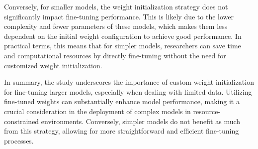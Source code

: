 Conversely, for smaller models, the weight initialization strategy does not significantly impact fine-tuning performance. This is likely due to the lower complexity and fewer parameters of these models, which makes them less dependent on the initial weight configuration to achieve good performance. In practical terms, this means that for simpler models, researchers can save time and computational resources by directly fine-tuning without the need for customized weight initialization.

In summary, the study underscores the importance of custom weight initialization for fine-tuning larger models, especially when dealing with limited data. Utilizing fine-tuned weights can substantially enhance model performance, making it a crucial consideration in the deployment of complex models in resource-constrained environments. Conversely, simpler models do not benefit as much from this strategy, allowing for more straightforward and efficient fine-tuning processes.







